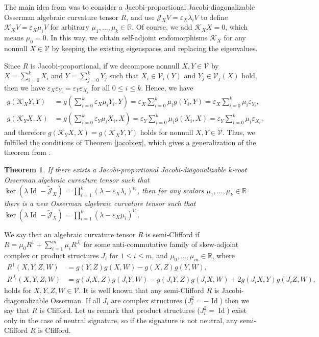 \documentclass[preprint]{elsarticle}
\newtheorem{theorem}{Theorem}%
\newcommand\mc{\mathcal}
\newcommand\mb{\mathbb}
\newcommand\ve{\varepsilon}%
\DeclareMathOperator{\id}{Id}
\begin{document}
The main idea from \cite{A9} was to consider a Jacobi-proportional Jacobi-diagonalizable Osserman algebraic curvature tensor $R$,
and use $\mc{J}_XV=\ve_X\lambda_iV$ to define $\mc{K}_XV=\ve_X\mu_iV$ for arbitrary $\mu_1,\dots,\mu_k\in\mb{R}$.
Of course, we add $\mc{K}_XX=0$, which means $\mu_0=0$.
In this way, we obtain self-adjoint endomorphisms $\mc{K}_X$ for any nonnull $X\in\mc{V}$ 
by keeping the existing eigenspaces and replacing the eigenvalues. 

Since $R$ is Jacobi-proportional, if we decompose nonnull $X,Y\in\mc{V}$ by $X=\sum_{i=0}^kX_i$ and $Y=\sum_{j=0}^kY_j$ 
such that $X_i\in\mc{V}_i(Y)$ and $Y_j\in\mc{V}_j(X)$ hold, then we have $\ve_X\ve_{Y_i}=\ve_Y\ve_{X_i}$ for all $0\leq i\leq k$.
Hence, we have
\begin{equation*}
\begin{aligned}
g(\mc{K}_X Y,Y)&=g\left(\sum_{i=0}^k\ve_X\mu_iY_i, Y\right)=\ve_X\sum_{i=0}^k\mu_i g({Y_i},Y)=\ve_X\sum_{i=0}^k\mu_i\ve_{Y_i},\\
g(\mc{K}_Y X,X)&=g\left(\sum_{i=0}^k\ve_Y\mu_iX_i, X\right)=\ve_Y\sum_{i=0}^k\mu_i g({X_i},X)=\ve_Y\sum_{i=0}^k\mu_i\ve_{X_i},
\end{aligned}
\end{equation*}
and therefore $g(\mc{K}_Y X,X)=g(\mc{K}_X Y,Y)$ holds for nonnull $X,Y\in\mc{V}$.
Thus, we fulfilled the conditions of Theorem \ref{jacobiex}, which gives a generalization of the theorem from \cite[Theorem 2]{A9}.

\begin{theorem}\label{newoss}
If there exists a Jacobi-proportional Jacobi-diagonalizable $k$-root Osserman algebraic curvature tensor such that 
$\ker(\lambda\id-\widetilde{\mc{J}}_X)=\prod_{i=1}^k(\lambda-\ve_X\lambda_i)^{\nu_i}$,
then for any scalars $\mu_1,\dots,\mu_k\in\mb{R}$ there is a new Osserman algebraic curvature tensor such that
$\ker(\lambda\id-\widetilde{\mc{J}}_X)=\prod_{i=1}^k(\lambda-\ve_X\mu_i)^{\nu_i}$.
\end{theorem}

We say that an algebraic curvature tensor $R$ is semi-Clifford if $R=\mu_0R^1+\sum_{i=1}^m\mu_iR^{J_i}$
for some anti-commutative family of skew-adjoint complex or product structures $J_i$ for $1\leq i\leq m$,
and $\mu_0,\dots,\mu_m\in\mb{R}$, where
\begin{equation*}
\begin{aligned}
R^1(X,Y,Z,W)&=g(Y,Z)g(X,W)-g(X,Z)g(Y,W),\\
R^{J_i}(X,Y,Z,W)&= g(J_iX,Z)g(J_iY,W) -g(J_iY,Z)g(J_iX,W) +2g(J_iX,Y)g(J_iZ,W),
\end{aligned}
\end{equation*}
holds for $X,Y,Z,W\in\mc{V}$.
It is well known that any semi-Clifford $R$ is Jacobi-diagonalizable Osserman.
If all $J_i$ are complex structures ($J_i^2=-\id$) then we say that $R$ is Clifford. 
Let us remark that product structures ($J_i^2=\id$) exist only in the case of neutral signature,
so if the signature is not neutral, any semi-Clifford $R$ is Clifford.
\end{document}
